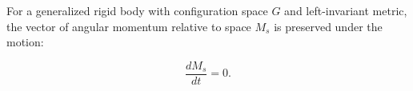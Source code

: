 For a generalized rigid body with configuration space $G$ and left-invariant metric, the vector of angular momentum relative to space $M_s$ is preserved under the motion:

$$\frac{dM_s}{dt} = 0.$$
